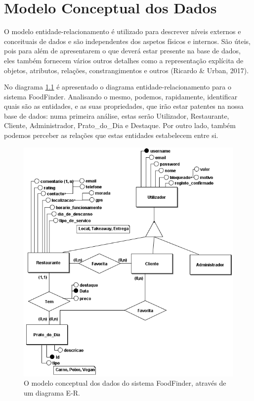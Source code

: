\documentclass[a4paper,12pt]{report}
\begin{document}
\chapter{Modelo Conceptual dos Dados}

	O modelo entidade-relacionamento é utilizado para descrever níveis externos e conceituais de dados e são independentes dos aspetos físicos e internos. São úteis, pois para além de apresentarem o que deverá estar presente na base de dados, eles também fornecem vários outros detalhes como a representação explícita de objetos, atributos, relações, constrangimentos e outros (Ricardo \& Urban, 2017).
	
	No diagrama \ref{fig:diagramaER} é apresentado o diagrama entidade-relacionamento para o sistema FoodFinder. Analisando o mesmo, podemos, rapidamente, identificar quais são as entidades, e as suas propriedades, que irão estar patentes na nossa base de dados: numa primeira análise, estas serão Utilizador, Restaurante, Cliente, Administrador, Prato\_do\_Dia e Destaque. Por outro lado, também podemos perceber as relações que estas entidades estabelecem entre si.

	\begin{figure}[H]
	\begin{center}
	\includegraphics[scale=0.85]{diagramaER}	
	\end{center}
	\medskip
	\caption{O modelo conceptual dos dados do sistema FoodFinder, através de um diagrama E-R.}
	\label{fig:diagramaER}	
	\end{figure}
\end{document}
